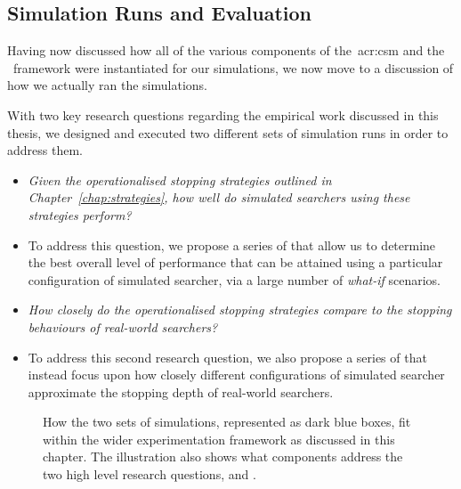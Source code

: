\subsection{Simulation Runs and Evaluation}\label{chap:csm:method:sim:runs}
Having now discussed how all of the various components of the~\gls{acr:csm} and the \simiir~framework were instantiated for our simulations, we now move to a discussion of how we actually ran the simulations.

With two key research questions regarding the empirical work discussed in this thesis, we designed and executed two different sets of simulation runs in order to address them.

\begin{itemize}
    \item[]{ \emph{Given the operationalised stopping strategies outlined in Chapter~\ref{chap:strategies}, how well do simulated searchers using these strategies perform?}}
    
    \item[]{To address this question, we propose a series of  that allow us to determine the best overall level of performance that can be attained using a particular configuration of simulated searcher, via a large number of \emph{what-if} scenarios.}
    
    \item[]{ \emph{How closely do the operationalised stopping strategies compare to the stopping behaviours of real-world searchers?}}
    
    \item[]{To address this second research question, we also propose a series of  that instead focus upon how closely different configurations of simulated searcher approximate the stopping depth of real-world searchers.}
\end{itemize}

\begin{figure}[t!]
    \centering
    \caption[The wider evaluation framework]{How the two sets of simulations, represented as dark blue boxes, fit within the wider experimentation framework as discussed in this chapter. The illustration also shows what components address the two high level research questions,  and .}
    \label{fig:sim_evaluation}
\end{figure}

